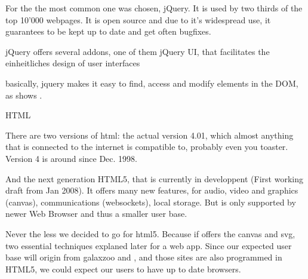 For \spl the the most common one was chosen, jQuery.
It is used by two thirds of the top 10'000 webpages.
It is open source and due to it's widespread use, it guarantees to be kept up to date and get often bugfixes.

jQuery offers several addons, one of them jQuery UI, that facilitates the einheitliches design of user interfaces

basically, jquery makes it easy to find, access and modify elements in the DOM, as shows .





HTML

There are two versions of html: the actual version 4.01, which almost anything that is connected to the internet is compatible to, probably even you toaster. Version 4 is around since Dec. 1998.

And the next generation HTML5, that is currently in developpent (First working draft from Jan 2008).
It offers many new features, for audio, video and graphics (canvas), communications (websockets), local storage.
But is only supported by newer Web Browser and thus a smaller user base.

Never the less we decided to go for html5. Because if offers the canvas and svg, two essential techniques explaned later for a web app.
Since our expected user base will origin from galaxzoo and \sw, and those sites are also programmed in HTML5, we could expect our users to have up to date browsers.







